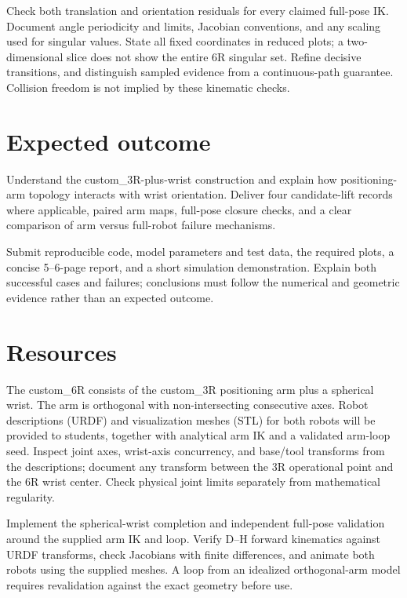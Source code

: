 \documentclass[11pt,a4paper]{article}
\begin{document}
Check both translation and orientation residuals
for every claimed full-pose IK. Document angle periodicity and limits,
Jacobian conventions, and any scaling used for singular values. State all
fixed coordinates in reduced plots; a two-dimensional slice does not show
the entire 6R singular set. Refine decisive transitions, and distinguish
sampled evidence from a continuous-path guarantee. Collision freedom is
not implied by these kinematic checks.

\section*{Expected outcome}
Understand the custom\_3R-plus-wrist construction and explain how
positioning-arm topology interacts with wrist orientation. Deliver four
candidate-lift records where applicable, paired arm maps, full-pose closure
checks, and a clear comparison of arm versus full-robot failure mechanisms.

Submit reproducible code, model parameters and test data, the required plots,
a concise 5--6-page report, and a short simulation demonstration. Explain
both successful cases and failures; conclusions must follow the numerical
and geometric evidence rather than an expected outcome.

\section*{Resources}
The custom\_6R consists of the custom\_3R positioning arm plus a
spherical wrist. The arm is orthogonal with non-intersecting consecutive axes.
Robot descriptions (URDF) and visualization meshes (STL) for both robots will
be provided to students, together with analytical arm IK and a validated
arm-loop seed. Inspect joint axes, wrist-axis concurrency, and base/tool
transforms from the descriptions; document any transform between the 3R
operational point and the 6R wrist center. Check physical joint limits
separately from mathematical regularity.

Implement the spherical-wrist completion and independent full-pose validation
around the supplied arm IK and loop. Verify D--H forward kinematics against
URDF transforms, check Jacobians with finite differences, and animate both
robots using the supplied meshes. A loop from an idealized orthogonal-arm
model requires revalidation against the exact geometry before use.
\end{document}
